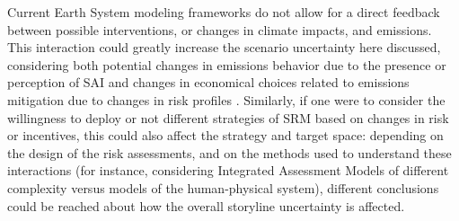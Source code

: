 \documentclass[acp, manuscript]{copernicus}
\begin{document}
Current Earth System modeling frameworks do not allow for a direct feedback between possible interventions, or changes in climate impacts, and emissions. This interaction could greatly increase the scenario uncertainty here discussed, considering both potential changes in emissions behavior due to the presence or perception of SAI and changes in economical choices related to emissions mitigation due to changes in risk profiles \citep[climate-society feedbacks, e.g.,][]{Beckage_2025}. Similarly, if one were to consider the willingness to deploy or not different strategies of SRM based on changes in risk or incentives, this could also affect the strategy and target space: depending on the design of the risk assessments, and on the methods used to understand these interactions (for instance, considering Integrated Assessment Models of different complexity versus models of the human-physical system), different conclusions could be reached about how the overall storyline uncertainty is affected.




\end{document}
